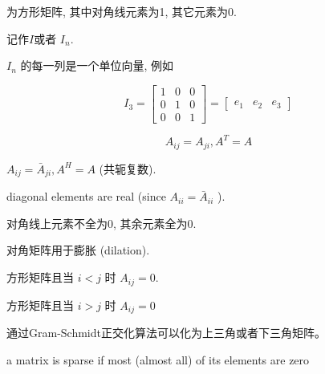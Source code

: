 \begin{definition}[单位矩阵]
    为方形矩阵, 其中对角线元素为1, 其它元素为0.

    记作$I$或者 $ {I}_{n} $.
\end{definition}

\begin{corollary}
  $ {I}_{n} $ 的每一列是一个单位向量, 例如

$$
{I}_{3}=\left[\begin{array}{lll}
1 & 0 & 0 \\
0 & 1 & 0 \\
0 & 0 & 1
\end{array}\right]=\left[\begin{array}{lll}
e_{1} & e_{2} & e_{3}
\end{array}\right]
$$
\end{corollary}

\begin{definition}
    $$ A_{i j}=A_{j i}, A^T =A $$
\end{definition}

\begin{definition}
    $ A_{i j}=\bar{A}_{j i}, A^H = A $ (共轭复数).
\end{definition}

\begin{remark}
    diagonal elements are real (since $ A_{i i}=\bar{A}_{i i} $ ).
\end{remark}

\begin{definition}
    对角线上元素不全为0, 其余元素全为0.
\end{definition}

对角矩阵用于膨胀 (dilation).

\begin{definition}[下三角矩阵]
    方形矩阵且当 $ i<j $ 时 $ A_{i j}=0 $.
\end{definition}

\begin{definition}[上三角矩阵]
    方形矩阵且当 $ i>j $ 时 $ A_{i j}=0 $
\end{definition}

通过Gram-Schmidt正交化算法可以化为上三角或者下三角矩阵。

\begin{definition}
    a matrix is sparse if most (almost all) of its elements are zero
\end{definition}

